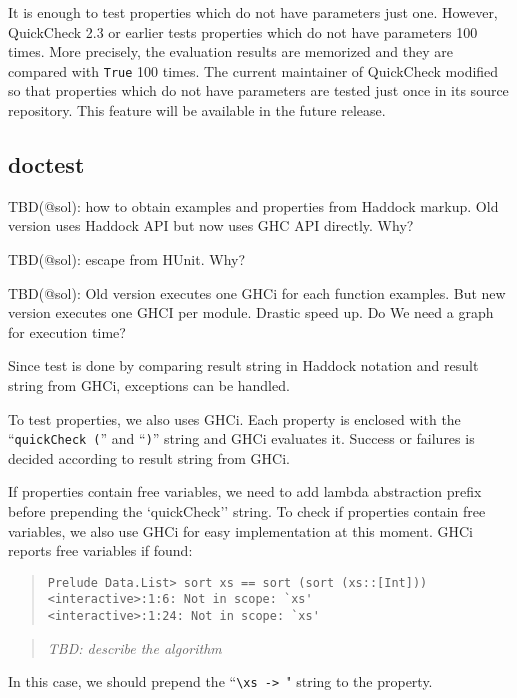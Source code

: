 \documentclass[preprint]{sigplanconf}
\begin{document}
It is enough to test properties which do not have parameters just one.
However, QuickCheck 2.3 or earlier tests 
properties which do not have parameters 100 times.
More precisely, the evaluation results are memorized and they are
compared with {\tt True} 100 times.
The current maintainer of QuickCheck modified so that
properties which do not have parameters
are tested just once in its source repository.
This feature will be available in the future release.

\subsection{doctest}
\label{sec:doctest}

TBD(@sol): how to obtain examples and properties from Haddock markup.
Old version uses Haddock API but now uses GHC API directly. Why?

TBD(@sol): escape from HUnit. Why?

TBD(@sol): Old version executes one GHCi for each function examples.
But new version executes one GHCI per module.
Drastic speed up. Do We need a graph for execution time?

Since test is done by comparing result string in Haddock notation
and result string from GHCi, exceptions can be handled.

To test properties, we also uses GHCi.
Each property is enclosed with
the ``\verb|quickCheck (|'' and ``\verb|)|'' string
and GHCi evaluates it.
Success or failures is decided according to result string from GHCi.

If properties contain free variables,
we need to add lambda abstraction prefix before prepending
the `quickCheck'' string.
To check if properties contain free variables,
we also use GHCi for easy implementation at this moment.
GHCi reports free variables if found:

\begin{quote}
\small
\begin{verbatim}
Prelude Data.List> sort xs == sort (sort (xs::[Int]))
<interactive>:1:6: Not in scope: `xs'
<interactive>:1:24: Not in scope: `xs'
\end{verbatim}
\end{quote}

\begin{quote}
    \emph{TBD: describe the algorithm}
\end{quote}


\noindent In this case, we should prepend the ``\verb|\xs -> |" string
to the property.
\end{document}
